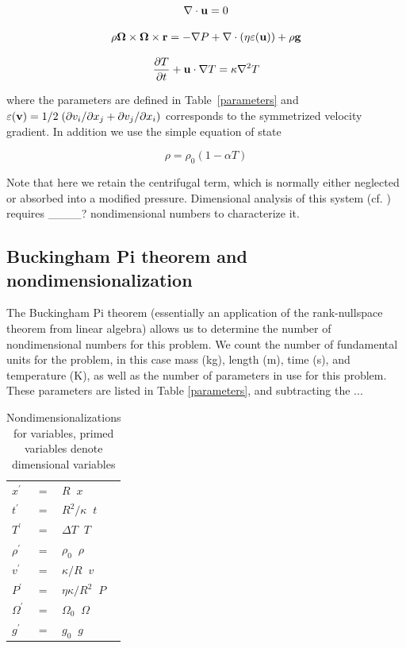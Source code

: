 \documentclass[extra,onecolumn]{gji}
\newif\ifdetail
\begin{document}
\begin{equation}
\nabla \cdot {\bf u} = 0
\label{conserve_mass}
\end{equation}

\begin{equation}
\begin{aligned}
 \rho{\bf \Omega \times \Omega \times r}= - \nabla P + \nabla \cdot \left( \eta \varepsilon ({\bf u}) \right) + \rho {\bf g}
\label{navier_stokes}
\end{aligned}
\end{equation}

\begin{equation}
\frac{\partial T}{\partial t} + {\bf u} \cdot \nabla T = \kappa \nabla^2 T
\label{energy}
\end{equation}

 where the parameters are defined in Table~\ref{parameters} and $\varepsilon({\bf v}) = 1/2 \; ( \partial v_i / \partial x_j + \partial v_j / \partial x_i )$ corresponds to the symmetrized velocity gradient.
 In addition we use the simple equation of state

\begin{equation}
\rho = \rho_0 \left( 1 - \alpha T \right)
\label{eos}
\end{equation}

Note that here we retain the centrifugal term, which is normally either neglected or absorbed into a modified pressure. 
Dimensional analysis of this system (cf. \citet{barenblatt1996scaling}) requires \_\_\_\_? nondimensional numbers to characterize it.

\ifdetail
\subsection{Buckingham Pi theorem and nondimensionalization}
The Buckingham Pi theorem (essentially an application of the rank-nullspace theorem from linear algebra) allows us to determine the number of nondimensional numbers for this problem.  
We count the number of fundamental units for the problem, in this case mass (kg), length (m), time (s), and temperature (K), as well as the number of parameters in use for this problem.  
These parameters are listed in Table \ref{parameters}, and subtracting the ...

\begin{table}
\centering
\caption{Nondimensionalizations for variables, primed variables denote dimensional variables}
\label{nondim_convert}
\begin{tabular}{@{}lll}
$x^\prime$ &=& $R \;\; x$ \\
$t^\prime$ &=& $R^2/\kappa \;\; t$ \\
$T^\prime$ &=& $\Delta T \;\; T$ \\
$\rho^\prime$ &=& $\rho_0 \;\; \rho$\\
$v^\prime$ &=& $\kappa/R \;\; v$ \\
$P^\prime$ &=& $\eta \kappa/R^2 \;\; P$ \\
$\Omega^\prime$ &=& $\Omega_0 \;\; \Omega$ \\
$g^\prime$ &=& $g_0 \;\; g$
\end{tabular}
\end{table}
\end{document}
